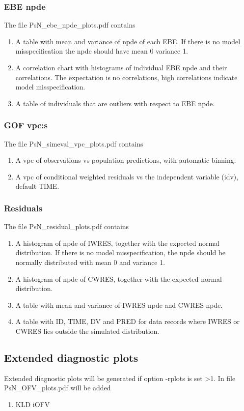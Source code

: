 \subsubsection{EBE npde}
\noindent The file PsN\_ebe\_npde\_plots.pdf contains
\begin{enumerate}
\item A table with mean and variance of npde of each EBE. If there is no model
misspecification the npde should have mean 0 variance 1.
\item A correlation chart with histograms of individual EBE npde and their
correlations. The expectation is no correlations, high correlations indicate model misspecification.
\item A table of individuals that are outliers with respect to EBE npde.
\end{enumerate}

\subsubsection{GOF vpc:s}
\noindent The file PsN\_simeval\_vpc\_plots.pdf contains
\begin{enumerate}
\item A vpc of observations vs population predictions, with automatic binning.
\item A vpc of conditional weighted residuals vs the independent variable (idv), default TIME.
\end{enumerate}


\subsubsection{Residuals}
\noindent The file PsN\_residual\_plots.pdf contains
\begin{enumerate}
\item A histogram of npde of IWRES, together with the expected
normal distribution. If there is no model misspecification, the npde should
be normally distributed with mean 0 and variance 1.
\item A histogram of npde of CWRES, together with the expected
normal distribution. 
\item A table with mean and variance of IWRES npde and CWRES npde.
\item A table with ID, TIME, DV and PRED for data records where IWRES or CWRES lies outside the simulated distribution.
\end{enumerate}


\subsection{Extended diagnostic plots}
Extended diagnostic plots will be generated
if option -rplots is set >1.
In file PsN\_OFV\_plots.pdf will be added
\begin{enumerate}
\item KLD iOFV
\end{enumerate}



